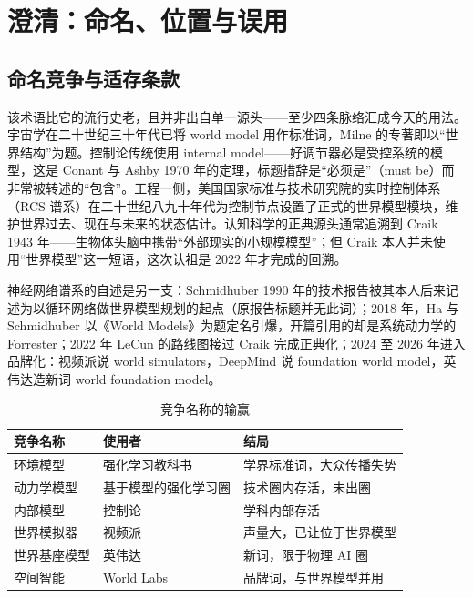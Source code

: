 \documentclass[10pt,fontset=fandol]{ctexart}
\begin{document}
\section{澄清：命名、位置与误用}\label{sec:clarify}

\subsection{命名竞争与适存条款}\label{sec:naming}

该术语比它的流行史老，且并非出自单一源头——至少四条脉络汇成今天的用法。宇宙学在二十世纪三十年代已将 world model 用作标准词，Milne 的专著即以“世界结构”为题\cite{milne1935}。控制论传统使用 internal model——好调节器必是受控系统的模型，这是 Conant 与 Ashby 1970 年的定理，标题措辞是“必须是”（must be）而非常被转述的“包含”\cite{conant1970}。工程一侧，美国国家标准与技术研究院的实时控制体系（RCS 谱系）在二十世纪八九十年代为控制节点设置了正式的世界模型模块，维护世界过去、现在与未来的状态估计\cite{albus2002rcs}。认知科学的正典源头通常追溯到 Craik 1943 年——生物体头脑中携带“外部现实的小规模模型”\cite{craik1943}；但 Craik 本人并未使用“世界模型”这一短语，这次认祖是 2022 年才完成的回溯\cite{lecun2022path}。

神经网络谱系的自述是另一支：Schmidhuber 1990 年的技术报告被其本人后来记述为以循环网络做世界模型规划的起点（原报告标题并无此词）\cite{schmidhuber1990}；2018 年，Ha 与 Schmidhuber 以《World Models》为题定名引爆\cite{ha2018world}，开篇引用的却是系统动力学的 Forrester\cite{forrester1971}；2022 年 LeCun 的路线图接过 Craik 完成正典化\cite{lecun2022path}；2024 至 2026 年进入品牌化：视频派说 world simulators\cite{openai2024sora}，DeepMind 说 foundation world model\cite{deepmind2025genie3}，英伟达造新词 world foundation model\cite{nvidia2025cosmos}。

\begin{table}[htbp]
\centering\small
\caption{竞争名称的输赢}
\label{tab:names}
\begin{tabularx}{\textwidth}{lYY}
\toprule
竞争名称 & 使用者 & 结局 \\
\midrule
环境模型 & 强化学习教科书\cite{sutton2018rl} & 学界标准词，大众传播失势 \\
动力学模型 & 基于模型的强化学习圈 & 技术圈内存活，未出圈 \\
内部模型 & 控制论 & 学科内部存活 \\
世界模拟器 & 视频派\cite{openai2024sora} & 声量大，已让位于世界模型 \\
世界基座模型 & 英伟达\cite{nvidia2025cosmos} & 新词，限于物理 AI 圈 \\
空间智能 & World Labs & 品牌词，与世界模型并用 \\
\bottomrule
\end{tabularx}
\end{table}
\end{document}
